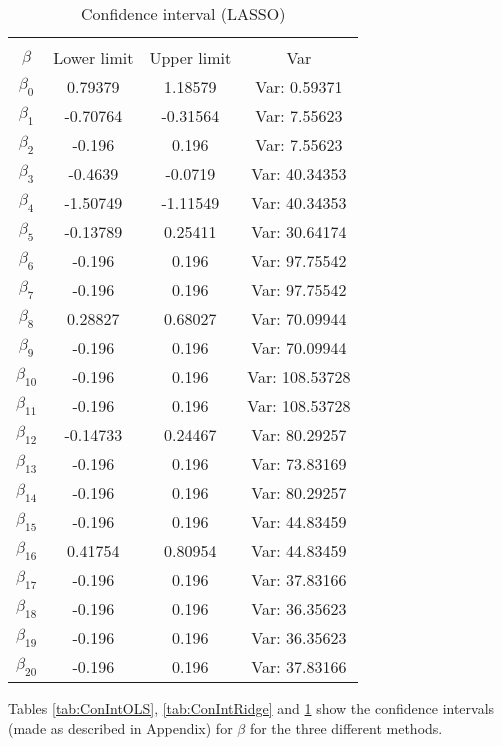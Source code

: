 \documentclass[a4paper]{article}
\begin{document}
\begin{table}[h!]
\caption{Confidence interval (LASSO)}
\begin{center}
\begin{tabular}{cccc}
	\hline
	\multicolumn{4}{c}{}\\
	$\beta$ & Lower limit & Upper limit & Var\\
	\hline
	$ \beta_{0} $ & 0.79379 & 1.18579 & Var: 0.59371 \\
	$ \beta_{1} $ & -0.70764 & -0.31564 & Var: 7.55623 \\
	$ \beta_{2} $ & -0.196 & 0.196 & Var: 7.55623 \\
	$ \beta_{3} $ & -0.4639 & -0.0719 & Var: 40.34353 \\
	$ \beta_{4} $ & -1.50749 & -1.11549 & Var: 40.34353 \\
	$ \beta_{5} $ & -0.13789 & 0.25411 & Var: 30.64174 \\
	$ \beta_{6} $ & -0.196 & 0.196 & Var: 97.75542 \\
	$ \beta_{7} $ & -0.196 & 0.196 & Var: 97.75542 \\
	$ \beta_{8} $ & 0.28827 & 0.68027 & Var: 70.09944 \\
	$ \beta_{9} $ & -0.196 & 0.196 & Var: 70.09944 \\
	$ \beta_{10} $ & -0.196 & 0.196 & Var: 108.53728 \\
	$ \beta_{11} $ & -0.196 & 0.196 & Var: 108.53728 \\
	$ \beta_{12} $ & -0.14733 & 0.24467 & Var: 80.29257 \\
	$ \beta_{13} $ & -0.196 & 0.196 & Var: 73.83169 \\
	$ \beta_{14} $ & -0.196 & 0.196 & Var: 80.29257 \\
	$ \beta_{15} $ & -0.196 & 0.196 & Var: 44.83459 \\
	$ \beta_{16} $ & 0.41754 & 0.80954 & Var: 44.83459 \\
	$ \beta_{17} $ & -0.196 & 0.196 & Var: 37.83166 \\
	$ \beta_{18} $ & -0.196 & 0.196 & Var: 36.35623 \\
	$ \beta_{19} $ & -0.196 & 0.196 & Var: 36.35623 \\
	$ \beta_{20} $ & -0.196 & 0.196 & Var: 37.83166 \\
\end{tabular}
\end{center}
\label{tab:ConIntLASSO}
\end{table}

Tables \ref{tab:ConIntOLS}, \ref{tab:ConIntRidge} and \ref{tab:ConIntLASSO} show the confidence intervals (made as described in Appendix) for $\beta$ for the three different methods.
\end{document}
